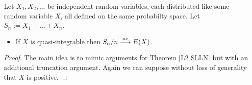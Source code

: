 


\begin{theorem}
Let $X_1, X_2,\ldots$ be independent random variables, each distributed like some random variable $X$, all defined on the same probabilty space. Let $S_n:= X_1+\ldots+ X_n$.
\begin{itemize}
\item If $X$ is quasi-integrable then $S_n/n \overset{\small ae} \longrightarrow E(X)$.
\end{itemize}
\end{theorem}

\begin{proof}
The main idea is to mimic arguments for Theorem \ref{L2 SLLN} but with an additional truncation argument. Again we can suppose without loss of generality  that $X$ is positive.


\end{proof}
